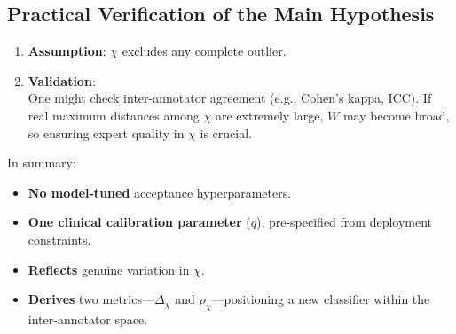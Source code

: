 \documentclass[12pt]{article}
\begin{document}
\subsection{Practical Verification of the Main Hypothesis}
\begin{enumerate}
\item \textbf{Assumption}: $\chi$ excludes any complete outlier.
\item \textbf{Validation}:\\
   One might check inter-annotator agreement (e.g., Cohen’s kappa, ICC). If real maximum distances among $\chi$ are extremely large, $W$ may become broad, so ensuring expert quality in $\chi$ is crucial.
\end{enumerate}
In summary:
\begin{itemize}
\item \textbf{No model-tuned} acceptance hyperparameters.
\item \textbf{One clinical calibration parameter} ($q$), pre-specified from deployment constraints.
\item \textbf{Reflects} genuine variation in $\chi$.
\item \textbf{Derives} two metrics---$\Delta_{\chi}$ and $\rho_{\chi}$---positioning a new classifier within the inter-annotator space.
\end{itemize}
\end{document}
